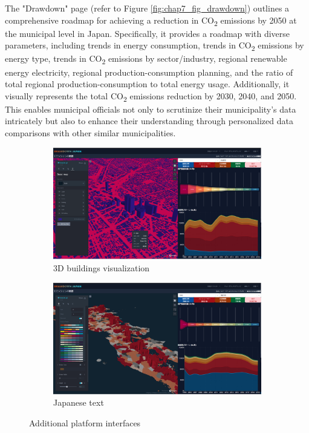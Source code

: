 The "Drawdown" page (refer to Figure \ref{fig:chap7_fig_drawdown}) outlines a comprehensive roadmap for achieving a reduction in CO\textsubscript{2} emissions by 2050 at the municipal level in Japan. Specifically, it provides a roadmap with diverse parameters, including trends in energy consumption, trends in CO\textsubscript{2} emissions by energy type, trends in CO\textsubscript{2} emissions by sector/industry, regional renewable energy electricity, regional production-consumption planning, and the ratio of total regional production-consumption to total energy usage. Additionally, it visually represents the total CO\textsubscript{2} emissions reduction by 2030, 2040, and 2050. This enables municipal officials not only to scrutinize their municipality's data intricately but also to enhance their understanding through personalized data comparisons with other similar municipalities. \par

\begin{figure}[tbh!]
  \centering
  \begin{subfigure}{.5\textwidth}
      \centering
      \includegraphics[width=.9\textwidth]{figs/chap7/3d_bldg.png}
      \caption{3D buildings visualization}
  \end{subfigure}%
  \begin{subfigure}{.5\textwidth}
      \centering
      \includegraphics[width=.9\textwidth]{figs/chap7/3d_ja.png}
      \caption{Japanese text}
  \end{subfigure}
  \caption{Additional platform interfaces}
  \label{fig:chap7_fig_other_interface}
\end{figure}

